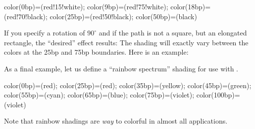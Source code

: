 \begin{command}{\pgfshadepath{}}
\begin{codeexample}[]
 {color(0bp)=(red!15!white); color(9bp)=(red!75!white);
 color(18bp)=(red!70!black); color(25bp)=(red!50!black); color(50bp)=(black)}
\hskip 1cm
\begin{pgfpicture}
  \pgfpathrectangle{\pgfpointorigin}{\pgfpoint{1cm}{1cm}}
  \pgfusepath{}
  \pgfpathcircle{\pgfpoint{3cm}{0cm}}{1cm}
  \pgfusepath{}
  \pgfpathcircle{\pgfpoint{6cm}{0cm}}{1cm}
  \pgfusepath{}
\end{pgfpicture}
\end{codeexample}

  If you specify a rotation of $90^\circ$
  and if the path is not a square, but an elongated rectangle,  the
  ``desired'' effect results: The shading will exactly vary between
  the colors at the 25bp and 75bp boundaries. Here is an example:
  
\begin{codeexample}[]
\begin{pgfpicture}
  \pgfpathrectangle{\pgfpointorigin}{\pgfpoint{2cm}{1cm}}
  \pgfpathrectangle{\pgfpoint{3cm}{0cm}}{\pgfpoint{2cm}{1cm}}
  \pgfpathrectangle{\pgfpoint{6cm}{0cm}}{\pgfpoint{2cm}{1cm}}
\end{pgfpicture}
\end{codeexample}


  As a final example, let us define a ``rainbow spectrum'' shading for
  use with \tikzname.
\begin{codeexample}[]
 {color(0bp)=(red); color(25bp)=(red); color(35bp)=(yellow);
  color(45bp)=(green); color(55bp)=(cyan); color(65bp)=(blue);
  color(75bp)=(violet); color(100bp)=(violet)}
\end{codeexample}

  Note that rainbow shadings are \emph{way} to colorful in almost all
  applications. 
\end{command}

